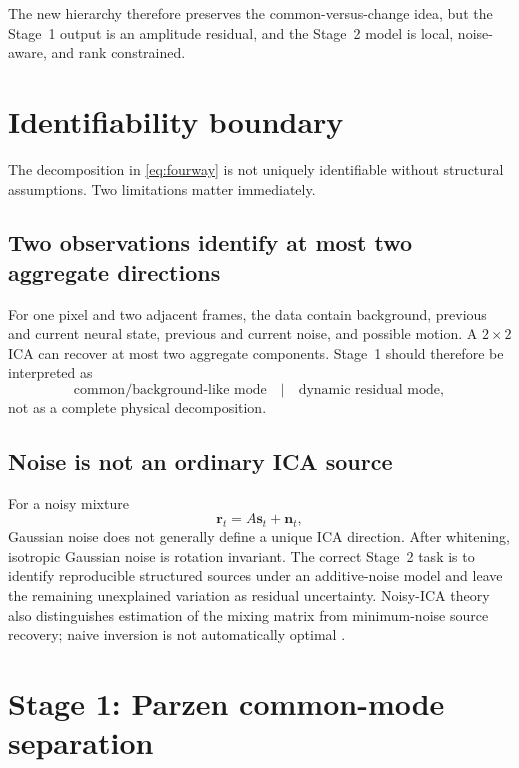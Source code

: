\documentclass[11pt]{article}
\begin{document}
The new hierarchy therefore preserves the common-versus-change idea, but the
Stage~1 output is an amplitude residual, and the Stage~2 model is local,
noise-aware, and rank constrained.

\section{Identifiability boundary}

The decomposition in \cref{eq:fourway} is not uniquely identifiable without
structural assumptions. Two limitations matter immediately.

\subsection{Two observations identify at most two aggregate directions}

For one pixel and two adjacent frames, the data contain background, previous and
current neural state, previous and current noise, and possible motion. A
$2\times2$ ICA can recover at most two aggregate components. Stage~1 should
therefore be interpreted as
\begin{equation}
\text{common/background-like mode}
\quad\big|\quad
\text{dynamic residual mode},
\end{equation}
not as a complete physical decomposition.

\subsection{Noise is not an ordinary ICA source}

For a noisy mixture
\begin{equation}
\bm r_t=A\bm s_t+\bm n_t,
\end{equation}
Gaussian noise does not generally define a unique ICA direction. After
whitening, isotropic Gaussian noise is rotation invariant. The correct Stage~2
task is to identify reproducible structured sources under an additive-noise
model and leave the remaining unexplained variation as residual uncertainty.
Noisy-ICA theory also distinguishes estimation of the mixing matrix from
minimum-noise source recovery; naive inversion is not automatically optimal
\cite{voss2015pegi}.

\section{Stage 1: Parzen common-mode separation}
\end{document}
